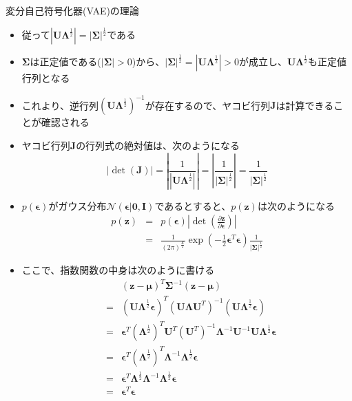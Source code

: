\documentclass[dvipdfmx,notheorems,t]{beamer}
\begin{document}
\begin{frame}{変分自己符号化器(VAE)の理論}
\begin{itemize}
\begin{itemize}
		\item 従って$\left| \bm{U} \bm{\Lambda}^\frac{1}{2} \right| = \left| \bm{\Sigma} \right|^\frac{1}{2}$である
		\item $\bm{\Sigma}$は正定値である($\left| \bm{\Sigma} \right| > 0$)から、$\left| \bm{\Sigma} \right|^\frac{1}{2} = \left| \bm{U} \bm{\Lambda}^\frac{1}{2} \right| > 0$が成立し、$\bm{U} \bm{\Lambda}^\frac{1}{2}$も正定値行列となる
		\item これより、逆行列$\left( \bm{U} \bm{\Lambda}^\frac{1}{2} \right)^{-1}$が存在するので、ヤコビ行列$\bm{J}$は計算できることが確認される
		\newline
		\item ヤコビ行列$\bm{J}$の行列式の絶対値は、次のようになる
		\begin{equation}
			\left| \det(\bm{J}) \right| = \left| \frac{1}{\left| \bm{U} \bm{\Lambda}^\frac{1}{2} \right|} \right| = \left| \frac{1}{\left| \bm{\Sigma} \right|^\frac{1}{2}} \right| = \frac{1}{\left| \bm{\Sigma} \right|^\frac{1}{2}}
		\end{equation}
		
		\item $p(\bm{\epsilon})$がガウス分布$\mathcal{N}(\bm{\epsilon} | \bm{0}, \bm{I})$であるとすると、$p(\bm{z})$は次のようになる
		\begin{eqnarray}
			p(\bm{z}) &=& p(\bm{\epsilon}) \left| \det \left( \frac{\partial \bm{z}}{\partial \bm{\epsilon}} \right) \right| \nonumber \\
			&=& \frac{1}{(2\pi)^\frac{K}{2}} \exp \left( -\frac{1}{2} \bm{\epsilon}^T \bm{\epsilon} \right) \frac{1}{|\bm{\Sigma}|^\frac{1}{2}}
		\end{eqnarray}
		
		\item ここで、指数関数の中身は次のように書ける
		\begin{eqnarray}
			&& \left( \bm{z} - \bm{\mu} \right)^T \bm{\Sigma}^{-1} \left( \bm{z} - \bm{\mu} \right) \nonumber \\
			&=& \left( \bm{U} \bm{\Lambda}^\frac{1}{2} \bm{\epsilon} \right)^T \left( \bm{U} \bm{\Lambda} \bm{U}^T \right)^{-1} \left( \bm{U} \bm{\Lambda}^\frac{1}{2} \bm{\epsilon} \right) \nonumber \\
			&=& \bm{\epsilon}^T \left( \bm{\Lambda}^\frac{1}{2} \right)^T \bm{U}^T \left( \bm{U}^T \right)^{-1} \bm{\Lambda}^{-1} \bm{U}^{-1} \bm{U} \bm{\Lambda}^\frac{1}{2} \bm{\epsilon} \nonumber \\
			&=& \bm{\epsilon}^T \left( \bm{\Lambda}^\frac{1}{2} \right)^T \bm{\Lambda}^{-1} \bm{\Lambda}^\frac{1}{2} \bm{\epsilon} \nonumber \\
			&=& \bm{\epsilon}^T \bm{\Lambda}^\frac{1}{2} \bm{\Lambda}^{-1} \bm{\Lambda}^\frac{1}{2} \bm{\epsilon} \nonumber \\
			&=& \bm{\epsilon}^T \bm{\epsilon}
		\end{eqnarray}
		

\end{itemize}
\end{itemize}
\end{frame}
\end{document}
